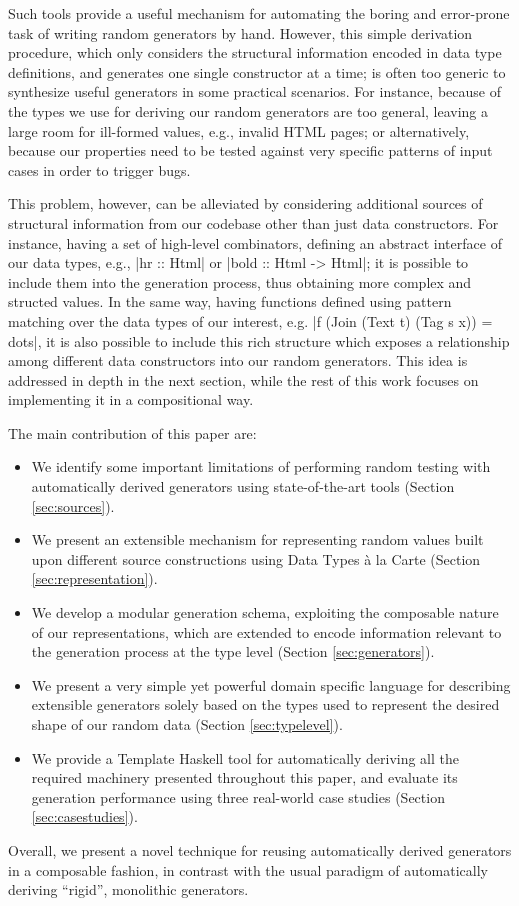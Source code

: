 %
Such tools provide a useful mechanism for automating the boring and error-prone
task of writing random generators by hand.
%
However, this simple derivation procedure, which only considers the structural
information encoded in data type definitions, and generates one single
constructor at a time; is often too generic to synthesize useful generators in
some practical scenarios.
%
For instance, because of the types we use for deriving our random generators are
too general, leaving a large room for ill-formed values, e.g., invalid HTML
pages; or alternatively, because our properties need to be tested against very
specific patterns of input cases in order to trigger bugs.

This problem, however, can be alleviated by considering additional sources of
structural information from our codebase other than just data constructors.
%
For instance, having a set of high-level combinators, defining an abstract
interface of our data types, e.g., |hr :: Html| or |bold :: Html -> Html|; it is
possible to include them into the generation process, thus obtaining more
complex and structed values.
%
In the same way, having functions defined using pattern matching over the data
types of our interest, e.g. |f (Join (Text t) (Tag s x)) = dots|, it is also
possible to include this rich structure which exposes a relationship among
different data constructors into our random generators.
%
This idea is addressed in depth in the next section, while the rest of this work
focuses on implementing it in a compositional way.

%
%
The main contribution of this paper are:
%
\begin{itemize}
\item We identify some important limitations of performing random testing with
  automatically derived generators using state-of-the-art tools (Section
  \ref{sec:sources}).
\item We present an extensible mechanism for representing random values built
  upon different source constructions using Data Types \`a la Carte (Section
  \ref{sec:representation}).
\item We develop a modular generation schema, exploiting the composable nature
  of our representations, which are extended to encode information relevant to
  the generation process at the type level (Section \ref{sec:generators}).
\item We present a very simple yet powerful domain specific language for
  describing extensible generators solely based on the types used to represent
  the desired shape of our random data (Section \ref{sec:typelevel}).
\item We provide a Template Haskell tool for automatically deriving all the
  required machinery presented throughout this paper, and evaluate its
  generation performance using three real-world case studies (Section
  \ref{sec:casestudies}).
\end{itemize}

Overall, we present a novel technique for reusing automatically derived
generators in a composable fashion, in contrast with the usual paradigm of
automatically deriving ``rigid'', monolithic generators.
